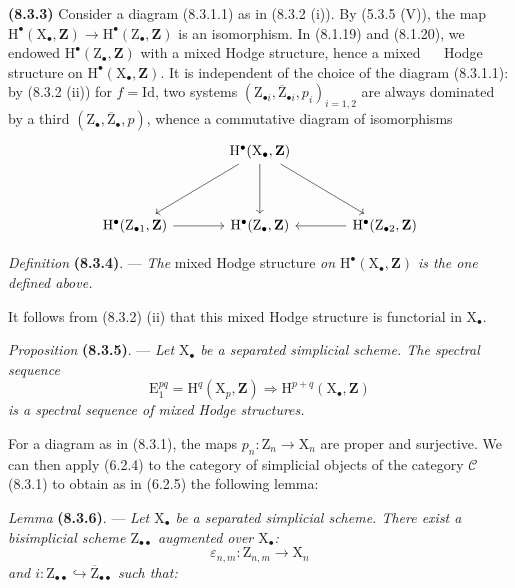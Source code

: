 \documentclass[11pt,leqno]{article}
\newcommand{\Page}[1]{\ifvmode\noindent\else\unskip\ \fi{\footnotesize\textcolor{gray}{[p.\,#1]}}\ \ignorespaces}
\begin{document}
\textbf{(8.3.3)} Consider a diagram (8.3.1.1) as in (8.3.2 (i)). By (5.3.5 (V)), the map \(\mathrm{H}^\bullet(\mathrm{X}_\bullet,\mathbf{Z})\to\mathrm{H}^\bullet(\mathrm{Z}_\bullet,\mathbf{Z})\) is an isomorphism. In (8.1.19) and (8.1.20), we endowed \(\mathrm{H}^\bullet(\mathrm{Z}_\bullet,\mathbf{Z})\) with a mixed Hodge structure, hence a mixed
\Page{42}
Hodge structure on \(\mathrm{H}^\bullet(\mathrm{X}_\bullet,\mathbf{Z})\). It is independent of the choice of the diagram (8.3.1.1): by (8.3.2 (ii)) for \(f=\mathrm{Id}\), two systems \((\mathrm{Z}_{\bullet i},\overline{\mathrm{Z}}_{\bullet i},p_i)_{i=1,2}\) are always dominated by a third \((\mathrm{Z}_\bullet,\overline{\mathrm{Z}}_\bullet,p)\), whence a commutative diagram of isomorphisms
\[
\begin{tikzcd}[column sep=large,row sep=huge]
 & \mathrm{H}^\bullet(\mathrm{X}_\bullet,\mathbf{Z})
   \arrow[dl] \arrow[d] \arrow[dr] &\\
\mathrm{H}^\bullet(\mathrm{Z}_{\bullet1},\mathbf{Z}) \arrow[r]
 & \mathrm{H}^\bullet(\mathrm{Z}_\bullet,\mathbf{Z})
 & \mathrm{H}^\bullet(\mathrm{Z}_{\bullet2},\mathbf{Z}) \arrow[l]
\end{tikzcd}
\]

\textit{Definition} \textbf{(8.3.4)}. — \textit{The} mixed Hodge structure \textit{on \(\mathrm{H}^\bullet(\mathrm{X}_\bullet,\mathbf{Z})\) is the one defined above.}

It follows from (8.3.2) (ii) that this mixed Hodge structure is functorial in \(\mathrm{X}_\bullet\).

\textit{Proposition} \textbf{(8.3.5)}. — \textit{Let \(\mathrm{X}_\bullet\) be a separated simplicial scheme. The spectral sequence}
\[
\mathrm{E}_1^{pq}=\mathrm{H}^q(\mathrm{X}_p,\mathbf{Z})
\Rightarrow\mathrm{H}^{p+q}(\mathrm{X}_\bullet,\mathbf{Z})
\]
\textit{is a spectral sequence of mixed Hodge structures.}

For a diagram as in (8.3.1), the maps \(p_n:\mathrm{Z}_n\to\mathrm{X}_n\) are proper and surjective. We can then apply (6.2.4) to the category of simplicial objects of the category \(\mathcal{C}\) (8.3.1) to obtain as in (6.2.5) the following lemma:

\textit{Lemma} \textbf{(8.3.6)}. — \textit{Let \(\mathrm{X}_\bullet\) be a separated simplicial scheme. There exist a bisimplicial scheme \(\mathrm{Z}_{\bullet\bullet}\) augmented over \(\mathrm{X}_\bullet\):}
\[
\varepsilon_{n,m}:\mathrm{Z}_{n,m}\to\mathrm{X}_n
\]
\textit{and \(i:\mathrm{Z}_{\bullet\bullet}\hookrightarrow\overline{\mathrm{Z}}_{\bullet\bullet}\) such that:}
\end{document}
